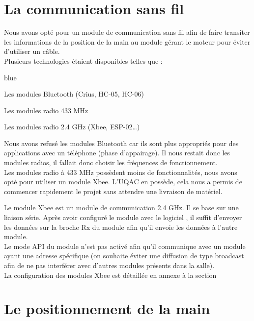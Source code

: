 \section{La communication sans fil}

Nous avons opté pour un module de communication sans fil afin de faire transiter les informations de la position de la main au module gérant le moteur pour éviter d'utiliser un câble.\\
Plusieurs technologies étaient disponibles telles que :

\begin{items}{blue}{\Triangle}
    \item Les modules Bluetooth (Crius, HC-05, HC-06)
    \item Les modules radio 433 MHz
    \item Les modules radio 2.4 GHz (Xbee, ESP-02…)
\end{items}


Nous avons refusé les modules Bluetooth car ils sont plus appropriés pour des applications avec un téléphone (phase d'appairage). Il nous restait donc les modules radios, il fallait donc choisir les fréquences de fonctionnement.\\

Les modules radio à 433 MHz possèdent moins de fonctionnalités, nous avons opté pour utiliser un module Xbee. L’UQAC en possède, cela nous a permis de commencer rapidement le projet sans attendre une livraison de matériel.\\

 
Le module Xbee est un module de communication 2.4 GHz. Il se base sur une liaison série.
Après avoir configuré le module avec le logiciel , il suffit d’envoyer les données sur la broche Rx du module afin qu’il envoie les données à l’autre module.\\
Le mode API du module n’est pas activé afin qu’il communique avec un module ayant une adresse spécifique (on souhaite éviter une diffusion de type broadcast afin de ne pas interférer avec d’autres modules présents dans la salle).\\

La configuration des modules Xbee est détaillée en annexe à la section  \link{\ref{xbee}}

\section{Le positionnement de la main}

